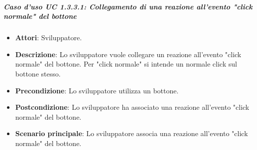 \subparagraph{Caso d'uso UC 1.3.3.1: Collegamento di una reazione all'evento "click normale" del bottone}

\FloatBarrier
\begin{itemize}
\item\textbf{Attori}: Sviluppatore.
\item\textbf{Descrizione}: Lo sviluppatore vuole collegare un reazione all'evento "click normale" del bottone. Per "click normale" si intende un normale click sul bottone stesso.
\item\textbf{Precondizione}: Lo sviluppatore utilizza un bottone.
\item\textbf{Postcondizione}: Lo sviluppatore ha associato una reazione all'evento "click normale" del bottone.
\item\textbf{Scenario principale}: Lo sviluppatore associa una reazione all'evento "click normale" del bottone.
\end{itemize}

